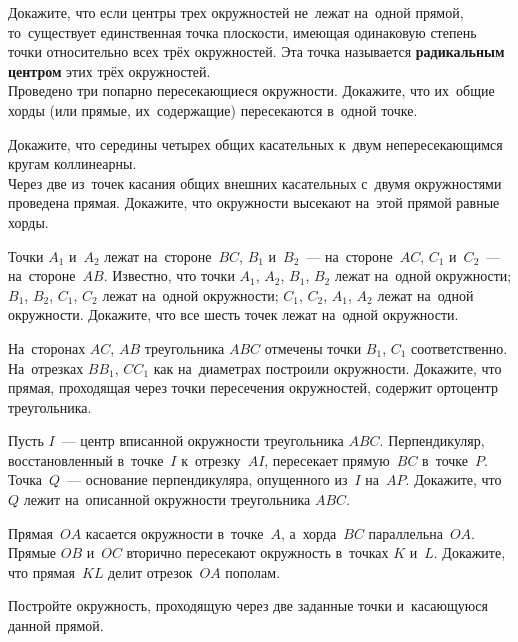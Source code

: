 \begin{problems}

\item
\sp
Докажите, что если центры трех окружностей не~лежат на~одной прямой,
то~существует единственная точка плоскости, имеющая одинаковую степень точки
относительно всех трёх окружностей.
Эта точка называется \textbf{радикальным центром} этих трёх окружностей.
\\
\sp
Проведено три попарно пересекающиеся окружности.
Докажите, что их~общие хорды (или прямые, их~содержащие) пересекаются в~одной
точке.

\item
\sp
Докажите, что середины четырех общих касательных к~двум непересекающимся кругам
коллинеарны.
\\
\sp
Через две из~точек касания общих внешних касательных с~двумя окружностями
проведена прямая.
Докажите, что окружности высекают на~этой прямой равные хорды.

\item
Точки $A_1$ и~$A_2$ лежат на~стороне~$BC$, $B_1$ и~$B_2$~--- на~стороне~$AC$,
$C_1$ и~$C_2$~--- на~стороне~$AB$.
Известно, что точки
$A_1$, $A_2$, $B_1$, $B_2$ лежат на~одной окружности;
$B_1$, $B_2$, $C_1$, $C_2$ лежат на~одной окружности;
$C_1$, $C_2$, $A_1$, $A_2$ лежат на~одной окружности.
Докажите, что все шесть точек лежат на~одной окружности.

\item
На~сторонах $AC$, $AB$ треугольника $ABC$ отмечены точки $B_1$, $C_1$
соответственно.
На~отрезках $B B_1$, $C C_1$ как на~диаметрах построили окружности.
Докажите, что прямая, проходящая через точки пересечения окружностей, содержит
ортоцентр треугольника.

\item
Пусть $I$~--- центр вписанной окружности треугольника $ABC$.
Перпендикуляр, восстановленный в~точке~$I$ к~отрезку~$AI$, пересекает
прямую~$BC$ в~точке~$P$.
Точка~$Q$~--- основание перпендикуляра, опущенного из~$I$ на~$AP$.
Докажите, что $Q$ лежит на~описанной окружности треугольника $ABC$.

\item
Прямая~$OA$ касается окружности в~точке~$A$, а~хорда~$BC$ параллельна~$OA$.
Прямые $OB$ и~$OC$ вторично пересекают окружность в~точках $K$ и~$L$.
Докажите, что прямая~$KL$ делит отрезок~$OA$ пополам.

\item
Постройте окружность, проходящую через две заданные точки и~касающуюся данной
прямой.


\end{problems}
